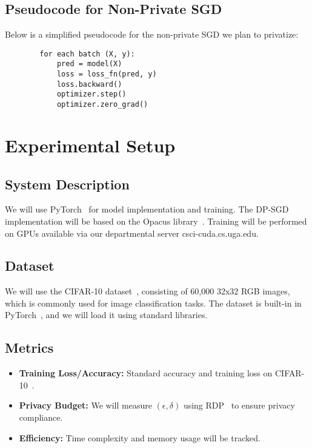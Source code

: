 \documentclass{article}
\begin{document}
    \subsection{Pseudocode for Non-Private SGD}\label{subsec:pseudo-code-for-non-private-sgd}
    Below is a simplified pseudocode for the non-private SGD we plan to privatize:
    \begin{verbatim}
        for each batch (X, y):
            pred = model(X)
            loss = loss_fn(pred, y)
            loss.backward()
            optimizer.step()
            optimizer.zero_grad()
    \end{verbatim}


    \section{Experimental Setup}\label{sec:experimental-setup}

    \subsection{System Description}\label{subsec:system-description}
    We will use PyTorch~\citep{pytorch_2019} for model implementation and training.
    The DP-SGD~\citep{Abadi_2016_DeepLearningDifferentialPrivacy} implementation will be based on the Opacus library~\citep{opacus}.
    Training will be performed on GPUs available via our departmental server csci-cuda.cs.uga.edu.

    \subsection{Dataset}\label{subsec:dataset}
    We will use the CIFAR-10 dataset~\citep{cifar10_dataset}, consisting of 60,000 32x32 RGB images, which is commonly used for
    image classification tasks.
    The dataset is built-in in PyTorch~\citep{pytorch_2019}, and we will load it using standard libraries.

    \subsection{Metrics}\label{subsec:metrics}
    \begin{itemize}
        \item \textbf{Training Loss/Accuracy:} Standard accuracy and training loss on CIFAR-10~\citep{cifar10_dataset}.
        \item \textbf{Privacy Budget:} We will measure $(\epsilon, \delta)$ using RDP~\citep{Mironov_2017_RenyiDP} to ensure privacy compliance.
        \item \textbf{Efficiency:} Time complexity and memory usage will be tracked.
    \end{itemize}
\end{document}
